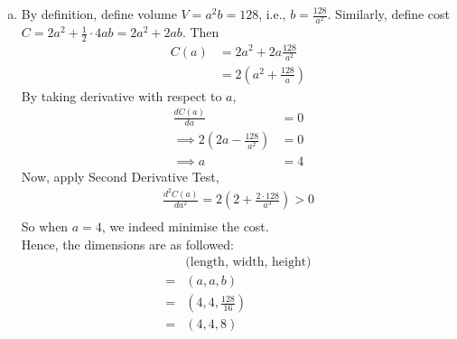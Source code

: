 \documentclass[11pt]{article}
\begin{document}
\begin{enumerate}[(a)]
    \item 
    By definition, define volume $V=a^2b= 128$, i.e., $\displaystyle b=\frac{128}{a^2}.$ Similarly, define cost $C=2a^2+\frac{1}{2}\cdot 4ab= 2a^2+2ab.$
    Then \begin{align*}
        C(a)&=2a^2+2a \frac{128}{a^2}\\
        &= 2\left(a^2+\frac{128}{a}\right)
    \end{align*}
    By taking derivative with respect to $a$, \begin{align*}
        \frac{dC(a)}{da}&=0 \\ 
        \implies 2\left(2a-\frac{128}{a^2}\right)&=0\\
        \implies a&=4
    \end{align*}
    Now, apply Second Derivative Test, 
    \begin{align*}
        \frac{d^2C(a)}{da^2}= 2 \left(2+\frac{2\cdot 128}{a^3}\right)>0 \\ 
    \end{align*}
    So when $a=4$, we indeed minimise the cost.\\ 
    Hence, the dimensions are as followed: 
    \begin{align*}
        &\text{(length, width, height)}\\
        =& (a,a,b)\\
        =& (4,4,\frac{128}{16})\\
        =& (4,4,8)
    \end{align*}
\end{enumerate}
\newpage
\end{document}
